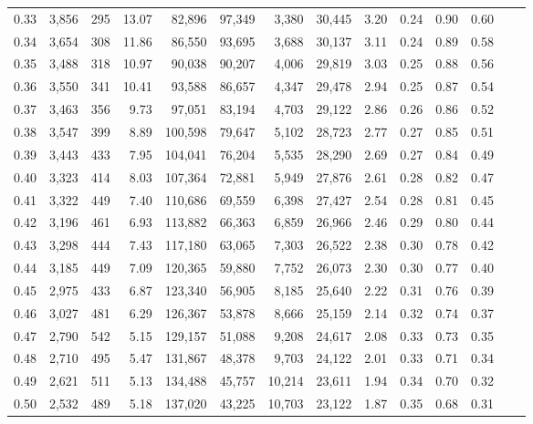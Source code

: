 \begin{tabular}{rrrrrrrrrrrrrr}
0.33 &  3,856 &  295 &   13.07 &   82,896 &   97,349 &   3,380 &  30,445 &  3.20 &  0.24 &  0.90 &      0.60 \\
0.34 &  3,654 &  308 &   11.86 &   86,550 &   93,695 &   3,688 &  30,137 &  3.11 &  0.24 &  0.89 &      0.58 \\
0.35 &  3,488 &  318 &   10.97 &   90,038 &   90,207 &   4,006 &  29,819 &  3.03 &  0.25 &  0.88 &      0.56 \\
0.36 &  3,550 &  341 &   10.41 &   93,588 &   86,657 &   4,347 &  29,478 &  2.94 &  0.25 &  0.87 &      0.54 \\
0.37 &  3,463 &  356 &    9.73 &   97,051 &   83,194 &   4,703 &  29,122 &  2.86 &  0.26 &  0.86 &      0.52 \\
0.38 &  3,547 &  399 &    8.89 &  100,598 &   79,647 &   5,102 &  28,723 &  2.77 &  0.27 &  0.85 &      0.51 \\
0.39 &  3,443 &  433 &    7.95 &  104,041 &   76,204 &   5,535 &  28,290 &  2.69 &  0.27 &  0.84 &      0.49 \\
0.40 &  3,323 &  414 &    8.03 &  107,364 &   72,881 &   5,949 &  27,876 &  2.61 &  0.28 &  0.82 &      0.47 \\
0.41 &  3,322 &  449 &    7.40 &  110,686 &   69,559 &   6,398 &  27,427 &  2.54 &  0.28 &  0.81 &      0.45 \\
0.42 &  3,196 &  461 &    6.93 &  113,882 &   66,363 &   6,859 &  26,966 &  2.46 &  0.29 &  0.80 &      0.44 \\
0.43 &  3,298 &  444 &    7.43 &  117,180 &   63,065 &   7,303 &  26,522 &  2.38 &  0.30 &  0.78 &      0.42 \\
0.44 &  3,185 &  449 &    7.09 &  120,365 &   59,880 &   7,752 &  26,073 &  2.30 &  0.30 &  0.77 &      0.40 \\
0.45 &  2,975 &  433 &    6.87 &  123,340 &   56,905 &   8,185 &  25,640 &  2.22 &  0.31 &  0.76 &      0.39 \\
0.46 &  3,027 &  481 &    6.29 &  126,367 &   53,878 &   8,666 &  25,159 &  2.14 &  0.32 &  0.74 &      0.37 \\
0.47 &  2,790 &  542 &    5.15 &  129,157 &   51,088 &   9,208 &  24,617 &  2.08 &  0.33 &  0.73 &      0.35 \\
0.48 &  2,710 &  495 &    5.47 &  131,867 &   48,378 &   9,703 &  24,122 &  2.01 &  0.33 &  0.71 &      0.34 \\
0.49 &  2,621 &  511 &    5.13 &  134,488 &   45,757 &  10,214 &  23,611 &  1.94 &  0.34 &  0.70 &      0.32 \\
0.50 &  2,532 &  489 &    5.18 &  137,020 &   43,225 &  10,703 &  23,122 &  1.87 &  0.35 &  0.68 &      0.31 \\

\end{tabular}
